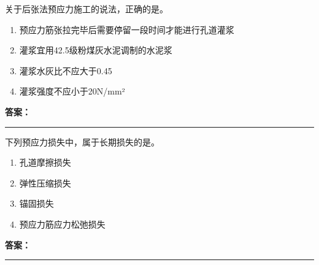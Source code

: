 \documentclass[UTF8,fontset=fandol,11pt]{ctexart}
\newcommand{\answerline}{\textcolor{answerred}{\rule{2.4cm}{0.7pt}}}
\begin{document}
\begin{quizbox}[title={乱序第 214 题｜第五章预应力混凝土工程}]

关于后张法预应力施工的说法，正确的是。\\

\begin{enumerate}[label=\Alph*.]

\item 预应力筋张拉完毕后需要停留一段时间才能进行孔道灌浆

\item 灌浆宜用42.5级粉煤灰水泥调制的水泥浆

\item 灌浆水灰比不应大于0.45

\item 灌浆强度不应小于20N/mm²

\end{enumerate}

\textbf{\textcolor{answerred}{答案：}} \answerline

\end{quizbox}

\vspace{0.2em}

\begin{quizbox}[title={乱序第 215 题｜第五章预应力混凝土工程}]

下列预应力损失中，属于长期损失的是。\\

\begin{enumerate}[label=\Alph*.]

\item 孔道摩擦损失

\item 弹性压缩损失

\item 锚固损失

\item 预应力筋应力松弛损失

\end{enumerate}

\textbf{\textcolor{answerred}{答案：}} \answerline

\end{quizbox}

\vspace{0.2em}
\end{document}
